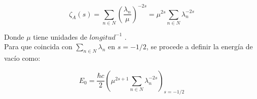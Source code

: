 \begin{equation}
\zeta _A (s) = \sum _{n \in N} \left( \frac{\lambda _n}{\mu }  \right) ^{-2s } = 
\mu ^{2s} \sum _{n \in N } \lambda _n ^{-2s}
\end{equation}

Donde $\mu $ tiene unidades de $longitud ^{-1}$ . \\

Para que coincida con $\underset{ {n \in N}}{  \sum } \lambda _n$ en $s= -1/2$, se procede a definir la energía de vacío como:

\begin{equation}
E _ 0 = 
\frac{\hbar c}{2 }
\left(
	\mu ^{2s+1} \sum _{n \in N} \lambda _n ^{-2s} 
	\right) _{s=-1/2}
\end{equation}